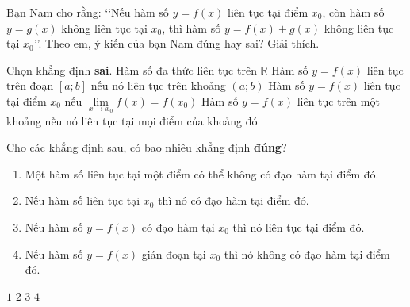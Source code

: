 \begin{bt}%
	Bạn Nam cho rằng: \lq\lq Nếu hàm số $ y=f(x) $ liên tục tại điểm $ x_{0} $, còn hàm số $ y=g(x) $ không liên tục tại $ x_{0} $, thì hàm số $ y=f(x)+g(x) $ không liên tục tại $ x_{0} $\rq\rq. Theo em, ý kiến của bạn Nam đúng hay sai? Giải thích.
\end{bt}

\begin{ex}%
	Chọn khẳng định  \textbf{sai}.
	 \choice
		{Hàm  số đa thức liên tục trên $\mathbb{R}$}
		{\True Hàm  số $y=f(x)$ liên tục trên đoạn $[a; b]$ nếu nó liên tục trên khoảng $(a; b)$}
		{Hàm số $y=f(x)$ liên  tục tại điểm $x_0$ nếu $\lim\limits_{x\to x_0} f(x)=f\left(x_0\right)$}
		{Hàm số $y=f(x)$ liên tục trên một khoảng nếu  nó liên tục tại mọi điểm của khoảng đó}
\end{ex}

\begin{ex}%
	Cho các khẳng định sau, có bao nhiêu khẳng định \textbf{đúng}? 
	\begin{enumerate}
		\item Một hàm số liên tục tại  một điểm có thể không có đạo hàm tại điểm đó.
		\item Nếu hàm số liên tục tại $ x_0  $ thì nó có đạo hàm tại điểm đó.
		\item Nếu hàm số  $ y= f(x) $ có đạo hàm tại $ x_0 $ thì nó liên tục tại điểm đó.
		\item Nếu hàm số $ y = f(x) $ gián  đoạn tại $ x_0 $ thì nó không có đạo hàm tại điểm đó.
	\end{enumerate}
	 \choice
		{$ 1  $}
		 {$ 2 $}
		{\True $ 3 $} 
		 {$ 4 $}
\end{ex}

